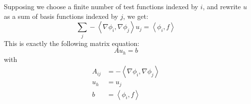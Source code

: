 \documentclass[reqno]{article}
\begin{document}
	Supposing we choose a finite number of test functions indexed by $i$, and rewrite $u$ as a sum of basis functions indexed by $j$, we get:
	\begin{equation}
		\sum_j -\left<\nabla \phi_i, \nabla \phi_j\right> u_j
		= \left< \phi_i, f \right>
	\end{equation}
	This is exactly the following matrix equation:
	\begin{equation}
		Au_h = b
	\end{equation}
	with
	\begin{align}
		A_{ij} &= -\left< \nabla \phi_i, \nabla \phi_j \right> \\
		u_h &= u_j \\
		b &= \left< \phi_i, f \right>
	\end{align}
	
\end{document}
